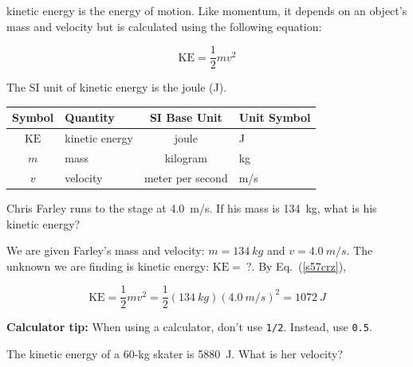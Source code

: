 \documentclass[main.tex]{subfiles}
\begin{document}
\solutionEnd

\vspace{1em}

\Gls{kinetic energy} is the energy of motion. Like momentum, it depends on an object's mass and velocity but is calculated using the following equation:

\begin{equation} \label{s57crz}
    \mathrm{KE} = \frac{1}{2} m v^2 
\end{equation}

The SI unit of kinetic energy is the joule (J).

\begin{center}
    \begin{tabular}{cl|cl}
    \hline
    \textbf{Symbol} & \textbf{Quantity} & \textbf{SI Base Unit} & \textbf{Unit Symbol}  \\
    \hline\hline
    \rule{0pt}{2.5ex}
        $\mathrm{KE}$ & kinetic energy & joule & J\\
        $m$ & mass & kilogram & kg\\
        $v$ & velocity & meter per second & m/s\\
    \hline
    \end{tabular}
\end{center}

\begin{example} \label{5qVtmV}
Chris Farley runs to the stage at \SI{4.0}{m/s}. If his mass is \SI{134}{kg}, what is his kinetic energy?
\end{example}

\Solution We are given Farley's mass and velocity: $m = \SI{134}{kg}$ and $v =  \SI{4.0}{m/s}$. The unknown we are finding is kinetic energy: $\mathrm{KE} =\ ?$. By Eq.~(\ref{s57crz}),

\begin{equation*}
    \mathrm{KE} = \frac{1}{2} m v^2 = \frac{1}{2} \left(\SI{134}{kg}\right) \left(\SI{4.0}{m/s}\right)^2 = \SI{1072}{J}
\end{equation*}

\solutionEnd

\begin{mdframed}[backgroundcolor=black!10]
\textbf{Calculator tip:} When using a calculator, don't use \texttt{1/2}. Instead, use \texttt{0.5}. 
\end{mdframed}

\begin{example} \label{PUlJG6}
The kinetic energy of a 60-kg skater is \SI{5880}{J}. What is her velocity?
\end{example}
\end{document}
